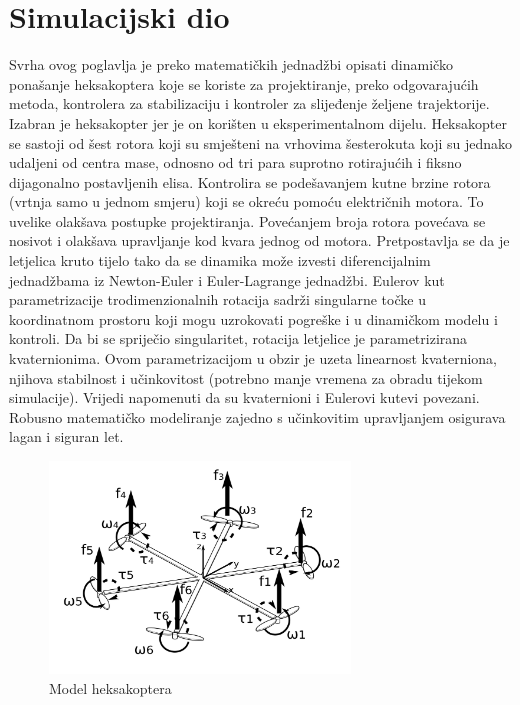 \documentclass[times, utf8, diplomski]{fer}
\begin{document}
\section{Simulacijski dio}\label{sec:SimulacijskiDio}
Svrha ovog poglavlja je preko matematičkih jednadžbi opisati dinamičko ponašanje heksakoptera koje se koriste za projektiranje, preko odgovarajućih metoda, kontrolera  za stabilizaciju i kontroler za slijeđenje željene trajektorije. Izabran je heksakopter jer je on korišten u eksperimentalnom dijelu. Heksakopter se sastoji od šest rotora koji su smješteni na vrhovima šesterokuta koji su jednako udaljeni od centra mase, odnosno od tri para suprotno rotirajućih i fiksno dijagonalno postavljenih elisa.  Kontrolira se podešavanjem kutne brzine rotora (vrtnja samo u jednom smjeru) koji se okreću pomoću električnih motora. To uvelike olakšava postupke projektiranja. Povećanjem broja rotora povećava se nosivot i olakšava upravljanje kod kvara jednog od motora. Pretpostavlja se da je letjelica kruto tijelo tako da se dinamika može izvesti diferencijalnim jednadžbama iz Newton-Euler i Euler-Lagrange jednadžbi. Eulerov kut parametrizacije trodimenzionalnih rotacija sadrži singularne točke u koordinatnom prostoru koji mogu uzrokovati pogreške i u dinamičkom modelu i kontroli. Da bi se spriječio singularitet, rotacija letjelice je parametrizirana kvaternionima. Ovom parametrizacijom u obzir je uzeta linearnost kvaterniona, njihova stabilnost i učinkovitost (potrebno manje vremena za obradu tijekom simulacije). Vrijedi napomenuti da su kvaternioni i Eulerovi kutevi povezani. Robusno matematičko modeliranje zajedno s učinkovitim upravljanjem osigurava lagan i siguran let. \citep{MathematicalModeling}
\begin{figure}[htb]
\centering
\includegraphics[width=8cm]{img/model_hexcopter.png}
\caption{Model heksakoptera\protect\footnotemark}
\label{fig:model}
\end{figure}
\end{document}

